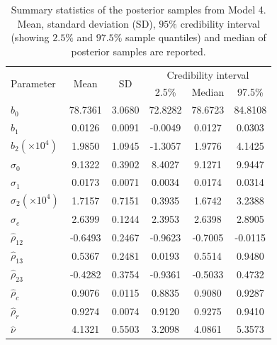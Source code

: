 \documentclass[a4paper]{article}   	%
\begin{document}
	\begin{table}[!htp]\centering
		\begin{tabular}{ l *{5}{c}} \toprule
			\multirow{2}{*}[-2pt]{Parameter}  &  \multirow{2}{*}[-2pt]{Mean}   & \multirow{2}{*}[-2pt]{SD}  &   \multicolumn{3}{c}{Credibility interval}  \\  \cmidrule{4-6} 
			&     &    &    2.5\%   &       Median  &      97.5\% \\ \midrule 
			$\hat{b}_0$   &  78.7361  & 3.0680  & 72.8282  & 78.6723  & 84.8108\\
			$\hat{b}_1$   &  0.0126 &   0.0091 &  -0.0049 &   0.0127 &  0.0303 \\
			$\hat{b}_2(\times 10^{4})$   & 1.9850 & 1.0945 & -1.3057 & 1.9776   &4.1425  \\
			$\hat{\sigma}_0$&  9.1322 & 0.3902  & 8.4027  & 9.1271  & 9.9447   \\
			$\hat{\sigma}_1$&  0.0173  & 0.0071  & 0.0034  & 0.0174  &  0.0314   \\
			$\hat{\sigma}_2(\times 10^{4})$&   1.7157  & 0.7151  & 0.3935  & 1.6742  & 3.2388   \\		
			$\hat{\sigma}_e$& 2.6399  & 0.1244  & 2.3953  & 2.6398  & 2.8905   \\
			$\hat{\rho}_{12}$& -0.6493 & 0.2467 & -0.9623 & -0.7005 & -0.0115 \\
			$\hat{\rho}_{13}$& 0.5367 & 0.2481 & 0.0193 & 0.5514 & 0.9480   \\
			$\hat{\rho}_{23}$&-0.4282 &  0.3754 & -0.9361 & -0.5033 &  0.4732  \\		
			$\hat{\rho}_c$   & 0.9076 & 0.0115 & 0.8835 & 0.9080 & 0.9287   \\
			$\hat{\rho}_r$   &  0.9274 & 0.0074&  0.9120& 0.9275 & 0.9410  \\
			$\hat{\nu}$ &  4.1321 & 0.5503 & 3.2098 & 4.0861 & 5.3573  \\
			\bottomrule
		\end{tabular}\caption{Summary statistics of the posterior samples from Model 4. Mean, standard deviation (SD), $95\%$ credibility interval (showing $2.5\%$ and $97.5\%$ sample quantiles) and median of posterior samples are reported. }\label{tb:resultModel4}
	\end{table}         
	
\end{document}
